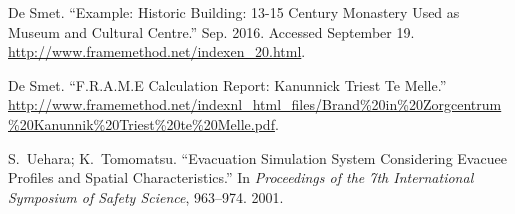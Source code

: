 \documentclass{style/llncs}
\begin{document}
{\begin{thebibliography}{36}
De Smet. \textquotedblleft{}Example: Historic Building: 13-15 Century Monastery Used as Museum and Cultural Centre.\textquotedblright{} Sep. 2016. Accessed September 19. \href{http://www.framemethod.net/indexen_20.html}{{\ttfamily http://\hspace{0pt}www.\hspace{0pt}framemethod.\hspace{0pt}net/\hspace{0pt}indexen\_\hspace{0pt}20.\hspace{0pt}html}}.\label{28}%

De Smet. \textquotedblleft{}F.R.A.M.E Calculation Report: Kanunnick Triest Te Melle.\textquotedblright{} \href{http://www.framemethod.net/indexnl_html_files/Brand\%2520in\%2520Zorgcentrum\%2520Kanunnik\%2520Triest\%2520te\%2520Melle.pdf}{{\ttfamily http://\hspace{0pt}www.\hspace{0pt}framemethod.\hspace{0pt}net/\hspace{0pt}indexnl\_\hspace{0pt}html\_\hspace{0pt}files/\hspace{0pt}Brand\hspace{0pt}\%20in\hspace{0pt}\%20Zorgcentrum\hspace{0pt}\%20Kanunnik\hspace{0pt}\%20Triest\hspace{0pt}\%20te\hspace{0pt}\%20Melle.\hspace{0pt}pdf}}.\label{30}%

S.~Uehara; K.~Tomomatsu. \textquotedblleft{}Evacuation Simulation System Considering Evacuee Profiles and Spatial Characteristics.\textquotedblright{} In \emph{Proceedings of the 7th International Symposium of Safety Science}, 963–974. 2001.\label{12}%
\par%
\end{thebibliography}}%
\end{document}
